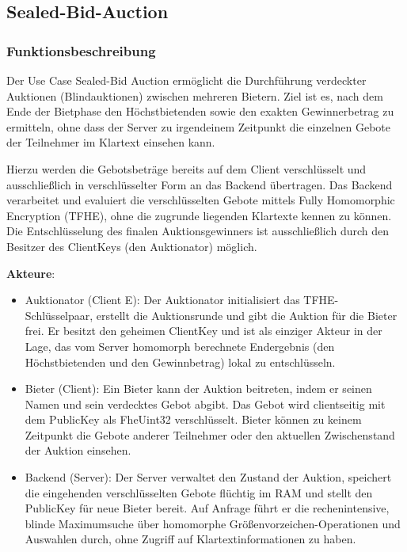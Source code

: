 \subsection{Sealed-Bid-Auction}
\label{sub:sealed_bid_auction}

\subsubsection{Funktionsbeschreibung}
Der Use Case Sealed-Bid Auction ermöglicht die Durchführung verdeckter Auktionen (Blindauktionen) zwischen mehreren Bietern. Ziel ist es, nach dem Ende der Bietphase den Höchstbietenden sowie den exakten Gewinnerbetrag zu ermitteln, ohne dass der Server zu irgendeinem Zeitpunkt die einzelnen Gebote der Teilnehmer im Klartext einsehen kann.\par
Hierzu werden die Gebotsbeträge bereits auf dem Client verschlüsselt und ausschließlich in verschlüsselter Form an das Backend übertragen. Das Backend verarbeitet und evaluiert die verschlüsselten Gebote mittels Fully Homomorphic Encryption (TFHE), ohne die zugrunde liegenden Klartexte kennen zu können. Die Entschlüsselung des finalen Auktionsgewinners ist ausschließlich durch den Besitzer des ClientKeys (den Auktionator) möglich.

\textbf{Akteure}:
\begin{itemize}
    \item Auktionator (Client E): Der Auktionator initialisiert das TFHE-Schlüsselpaar, erstellt die Auktionsrunde und gibt die Auktion für die Bieter frei. Er besitzt den geheimen ClientKey und ist als einziger Akteur in der Lage, das vom Server homomorph berechnete Endergebnis (den Höchstbietenden und den Gewinnbetrag) lokal zu entschlüsseln.
    \item Bieter (Client): Ein Bieter kann der Auktion beitreten, indem er seinen Namen und sein verdecktes Gebot abgibt. Das Gebot wird clientseitig mit dem PublicKey als FheUint32 verschlüsselt. Bieter können zu keinem Zeitpunkt die Gebote anderer Teilnehmer oder den aktuellen Zwischenstand der Auktion einsehen.
    \item Backend (Server): Der Server verwaltet den Zustand der Auktion, speichert die eingehenden verschlüsselten Gebote flüchtig im RAM und stellt den PublicKey für neue Bieter bereit. Auf Anfrage führt er die rechenintensive, blinde Maximumsuche über homomorphe Größenvorzeichen-Operationen und Auswahlen durch, ohne Zugriff auf Klartextinformationen zu haben.
\end{itemize}

